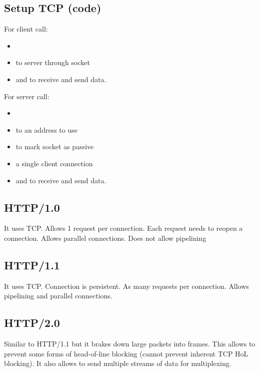\subsection*{Setup TCP (code)}
For client call:
\begin{footnotesize}
  \begin{itemize}[itemsep=-0.5em]
    \item {}
    \item {} to server through socket
    \item {} and  to receive and send data.
  \end{itemize}
\end{footnotesize}
For server call:
\begin{footnotesize}
  \begin{itemize}[itemsep=-0.5em]
    \item {}
    \item {} to an address to use
    \item {} to mark socket as passive
    \item {} a single client connection
    \item {} and  to receive and send data.
  \end{itemize}
\end{footnotesize}
\subsection*{HTTP/1.0}
It uses TCP. Allows 1 request per connection. Each request needs to
reopen a connection. Allows parallel connections. Does not allow
pipelining
\subsection*{HTTP/1.1}
It uses TCP. Connection is persistent. As many requests per connection.
Allows pipelining and parallel connections.
\subsection*{HTTP/2.0}
Similar to HTTP/1.1 but it brakes down large packets into frames. This
allows to prevent some forms of head-of-line blocking (cannot prevent
inherent TCP HoL blocking). It also allows to send multiple streams of
data for multiplexing.
